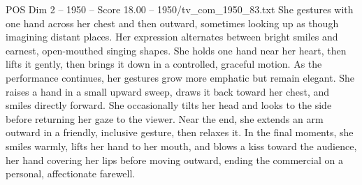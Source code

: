 \begin{textsample}{POS Dim 2 – 1950 – Score 18.00 – 1950/tv\_com\_1950\_83.txt}
She gestures with one hand across her chest and then outward, sometimes looking up as though imagining distant places.
Her expression alternates between bright smiles and earnest, open-mouthed singing shapes.
She holds one hand near her heart, then lifts it gently, then brings it down in a controlled, graceful motion.
As the performance continues, her gestures grow more emphatic but remain elegant.
She raises a hand in a small upward sweep, draws it back toward her chest, and smiles directly forward.
She occasionally tilts her head and looks to the side before returning her gaze to the viewer.
Near the end, she extends an arm outward in a friendly, inclusive gesture, then relaxes it.
In the final moments, she smiles warmly, lifts her hand to her mouth, and blows a kiss toward the audience, her hand covering her lips before moving outward, ending the commercial on a personal, affectionate farewell.

\end{textsample}

